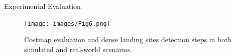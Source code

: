 \documentclass[10pt]{beamer}
\begin{document}

    \begin{frame}{Experimental Evaluation}
        \begin{figure}
            \caption{
                \justifying
                Costmap evaluation and dense landing sites detection steps
                in both simulated and real-world scenarios.}
            \vspace{-0.3cm}
            \texttt{[image: images/Fig6.png]}
        \end{figure}
    \end{frame}
\end{document}
